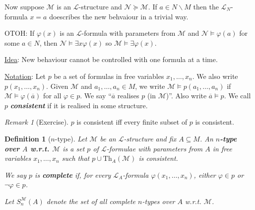 \documentclass[]{article}
\theoremstyle{custhm}
\theoremstyle{cusdef}
\newtheorem{defin}[theorem]{Definition}
\theoremstyle{custhm}
\theoremstyle{custhm}
\theoremstyle{custhm}
\theoremstyle{ex}
\theoremstyle{custhm}
\theoremstyle{cusdef}
\theoremstyle{remark}
\newtheorem*{remark*}{Remark}
\theoremstyle{remark}
\newcommand{\undf}[1]{\textit{\textbf{#1}}}
\renewcommand{\L}{\mathcal{L}}
\newcommand{\M}{\mathcal{M}}
\renewcommand{\phi}{\varphi}
\renewcommand{\bar}{\overline}
\newcommand{\Th}{\textrm{Th}}
\newcommand{\N}{\mathcal{N}}
\renewcommand{\subset}{\subseteq}
\begin{document}
Now suppose $\M$ is an $\L$-structure and $\N\succeq\M$. If $a\in N\backslash M$ then the $\L_N$-formula $x = a$ doescribes the new behvaiour in a trivial way.

OTOH: If $\phi(x)$ is an $\L$-formula with parameters from $\M$ and $\N\models \phi(a)$ for some $a\in N$, then $\N\models \exists x\phi(x)$ so $\M\models \exists \phi(x)$.

\underline{Idea}: New behaviour cannot be controlled with one formula at a time.

\underline{Notation}: Let $p$ be a set of formulas in free variables $x_1,\dots,x_n$. We also write $p(x_1,\dots,x_n)$. Given $\M$ and $a_1,\dots,a_n\in M$, we write $\M\models p(a_1,\dots,a_n)$ if $\M\models \phi(\bar{a})$ for all $\phi\in p$. We say ``$\bar{a}$ realises $p$ (in $\M$)''. Also write $\bar{a}\models p$. We call $p$ \undf{consistent} if it is realised in some structure.

\begin{remark*}[Exercise]
$p$ is consistent iff every finite subset of $p$ is consistent.
\end{remark*}

\begin{defin}[$n$-type]
Let $\M$ be an $\L$-structure and fix $A\subset M$. An \undf{$n$-type over $A$ w.r.t. $\M$} is a set $p$ of $\L$-formulae with parameters from $A$ in free variables $x_1,\dots,x_n$ such that $p\cup \Th_A(\M)$ is consistent.

We say $p$ is \undf{complete} if, for every $\L_A$-formula $\phi(x_1,\dots,x_n)$, either $\phi \in p$ or $\neg \phi \in p$.

Let $S_n^\M(A)$ denote the set of all complete $n$-types over $A$ w.r.t. $\M$.
\end{defin}
\end{document}
